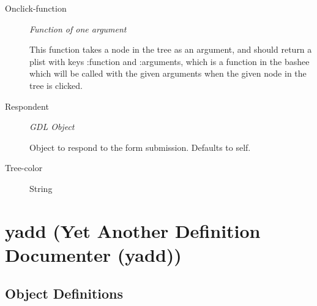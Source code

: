 \documentclass [11pt]{book}
\begin{document}
\begin{itemize}
\begin{description}
\item [Onclick-function]
\emph{Function of one argument}

 This function takes a node in the tree as an argument, and should return
a plist with keys :function and :arguments, which is a function in the bashee which will be called
with the given arguments when the given node in the tree is clicked.




\item [Respondent]
\emph{GDL Object}

 Object to respond to the form submission. Defaults to self.




\item [Tree-color]

String




\end{description}







\end{itemize}





\section{yadd (Yet Another Definition Documenter (yadd))}

\label{sec:yadd(yetanotherdefinitiondocumenter(yadd))}





\subsection{Object Definitions}

\label{subsec:objectdefinitions}
\end{document}
